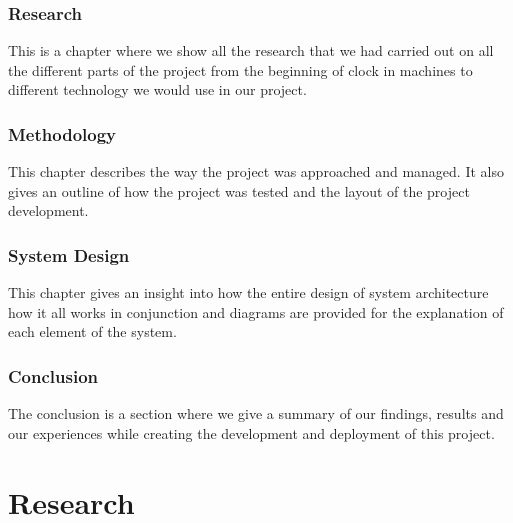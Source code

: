 \subsection{Research}
This is a chapter where we show all the research that we had carried out on all the different parts of the project from the beginning of clock in machines to different technology we would use in our project.
\\
\subsection{Methodology}
This chapter describes the way the project was approached and managed. It also gives
an outline of how the project was tested and the layout of the project development.
\\
\subsection{System Design}
This chapter gives an insight into how the entire design of system architecture how it all works in conjunction and diagrams are provided for the explanation of each element of the system.
\\
\subsection{Conclusion}
The conclusion is a section where we give a summary of our findings, results and our
experiences while creating the development and deployment of this project.


\chapter{Research}
